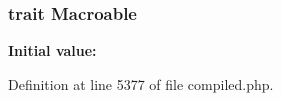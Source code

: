 \subsubsection[{Macroable}]{\setlength{\rightskip}{0pt plus 5cm}trait Macroable}\label{namespace_illuminate_1_1_support_1_1_traits_ab1f047a2dd118012bf762117381ef220}
{\bfseries Initial value\+:}


Definition at line 5377 of file compiled.\+php.

